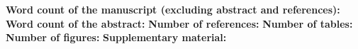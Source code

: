 \textbf{Word count of the manuscript (excluding abstract and references): } \\
\textbf{Word count of the abstract: } \newline
\textbf{Number of references: } \newline
\textbf{Number of tables: } \newline
\textbf{Number of figures: } \newline
\textbf{Supplementary material: } \newline
